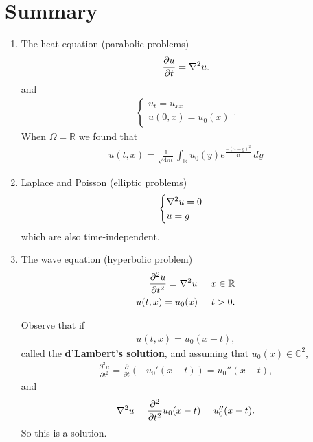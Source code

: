 \documentclass{book}
\theoremstyle{definition}
\newcommand{\p}{\partial}
\newcommand{\R}{\mathbb{R}}
\newcommand{\f}[2]{\frac{#1}{#2}}
\newcommand{\lp}{\left(}
\newcommand{\rp}{\right)}
\begin{document}
\newpage



\chapter{Summary}

\begin{enumerate}
	\item The heat equation (parabolic problems)
	\begin{align*}
	\f{\p u}{\p t} = \laplacian u.
	\end{align*}
	and
	\begin{align*}
	\begin{cases}
	u_t = u_{xx}\\
	u(0,x) = u_0(x)
	\end{cases}.
	\end{align*}
	When $\Omega = \R$ we found that
	\begin{align*}
	\boxed{u(t,x) = \f{1}{\sqrt{4\pi t}} \int_\R u_0(y)e^{\f{-(x-y)^2}{4t}}\,dy}
	\end{align*}
	
	
	\item Laplace and Poisson (elliptic problems)
	\begin{align*}
	\begin{cases}
	\laplacian u = 0\\
	u = g
	\end{cases}
	\end{align*}
	which are also time-independent. 
	
	
	\item The wave equation (hyperbolic problem)
	\begin{align*}
	\f{\p^2 u }{\p t^2} = \laplacian u \hspace{0.5cm} x\in\R\\
	u(t,x) = u_0(x)\hspace{0.5cm} t > 0.
	\end{align*}

	Observe that if
	\begin{align*}
	u(t,x) = u_0(x-t),
	\end{align*}
	called the \textbf{d'Lambert's solution}, and assuming that $u_0(x) \in \mathbb{C}^2$,
	\begin{align*}
	\f{\p^2 u}{\p t^2} = \f{\p }{\p t}\lp -u_0'(x-t) \rp = u_0''(x-t),
	\end{align*}
	and
	\begin{align*}
	\laplacian u = \f{\p^2}{\p t^2}u_0(x-t) = u_0''(x-t).
	\end{align*}
	So this is a solution. 
	

\end{enumerate}
\end{document}
